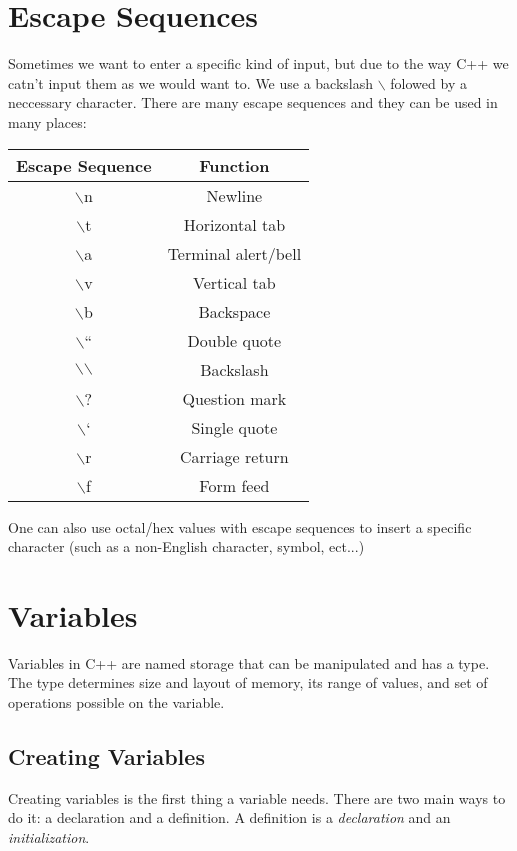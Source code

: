 \documentclass[12pt, a4paper]{report}
\begin{document}
\section{Escape Sequences}
Sometimes we want to enter a specific kind of input, but due to the way C++ we catn't input them as we would want to. We use a backslash $\backslash$ folowed by a neccessary character. There are many escape sequences and they can be used in many places:
\begin{center}
  \begin{tabular}{ |c|c| }
    \hline
    \textbf{Escape Sequence} & \textbf{Function} \\
    \hline
    $\backslash$n & Newline \\
    \hline
    $\backslash$t & Horizontal tab \\
    \hline
    $\backslash$a & Terminal alert/bell \\
    \hline
    $\backslash$v & Vertical tab \\
    \hline
    $\backslash$b & Backspace \\
    \hline
    $\backslash$`` & Double quote \\
    \hline
    $\backslash$$\backslash$ & Backslash \\
    \hline
    $\backslash$? & Question mark \\
    \hline
    $\backslash$` & Single quote \\
    \hline
    $\backslash$r & Carriage return \\
    \hline
    $\backslash$f & Form feed \\
    \hline
  \end{tabular}
\end{center}
One can also use octal/hex values with escape sequences to insert a specific character (such as a non-English character, symbol, ect...)
\section{Variables}
Variables in C++ are named storage that can be manipulated and has a type. The type determines size and layout of memory, its range of values, and set of operations possible on the variable.
\subsection{Creating Variables}
Creating variables is the first thing a variable needs. There are two main ways to do it: a declaration and a definition. A definition is a \emph{declaration} and an \emph{initialization}.
\end{document}
